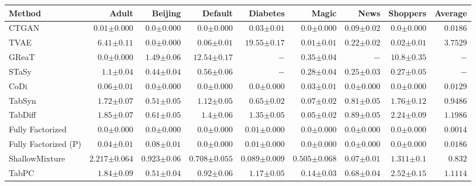 \begin{tabular}{lrrrrrrr|r}
    \toprule[0.8pt]
     \textbf{Method} & \textbf{Adult} & \textbf{Beijing} & \textbf{Default} & \textbf{Diabetes} & \textbf{Magic} & \textbf{News} & \textbf{Shoppers} & \textbf{Average} \\
    \midrule 
    CTGAN & $0.01${\tiny${\pm 0.000}$} & $0.0${\tiny${\pm 0.000}$} & $0.0${\tiny${\pm 0.000}$} & $0.03${\tiny${\pm 0.01}$} & $0.0${\tiny${\pm 0.000}$} & $0.09${\tiny${\pm 0.02}$} & $0.0${\tiny${\pm 0.000}$} & $0.0186$ \\
    TVAE & $6.41${\tiny${\pm 0.11}$} & $0.0${\tiny${\pm 0.000}$} & $0.06${\tiny${\pm 0.01}$} & $19.55${\tiny${\pm 0.17}$} & $0.01${\tiny${\pm 0.01}$} & $0.22${\tiny${\pm 0.02}$} & $0.02${\tiny${\pm 0.01}$} & $3.7529$ \\
    GReaT & $0.0${\tiny${\pm 0.000}$} & $1.49${\tiny${\pm 0.06}$} & $12.54${\tiny${\pm 0.17}$} & $-$ & $0.35${\tiny${\pm 0.04}$} & $-$ & $10.8${\tiny${\pm 0.35}$} & $-$ \\
    STaSy & $1.1${\tiny${\pm 0.04}$} & $0.44${\tiny${\pm 0.04}$} & $0.56${\tiny${\pm 0.06}$} & $-$ & $0.28${\tiny${\pm 0.04}$} & $0.25${\tiny${\pm 0.03}$} & $0.27${\tiny${\pm 0.05}$} & $-$ \\
    CoDi & $0.06${\tiny${\pm 0.01}$} & $0.0${\tiny${\pm 0.000}$} & $0.0${\tiny${\pm 0.000}$} & $0.0${\tiny${\pm 0.000}$} & $0.03${\tiny${\pm 0.01}$} & $0.0${\tiny${\pm 0.000}$} & $0.0${\tiny${\pm 0.000}$} & $0.0129$ \\
    TabSyn & $1.72${\tiny${\pm 0.07}$} & $0.51${\tiny${\pm 0.05}$} & $1.12${\tiny${\pm 0.05}$} & $0.65${\tiny${\pm 0.02}$} & $0.07${\tiny${\pm 0.02}$} & $0.81${\tiny${\pm 0.05}$} & $1.76${\tiny${\pm 0.12}$} & $0.9486$ \\
    TabDiff & $1.85${\tiny${\pm 0.07}$} & $0.61${\tiny${\pm 0.05}$} & $1.4${\tiny${\pm 0.06}$} & $1.35${\tiny${\pm 0.05}$} & $0.05${\tiny${\pm 0.02}$} & $0.89${\tiny${\pm 0.05}$} & $2.24${\tiny${\pm 0.09}$} & $1.1986$ \\
    \midrule
    Fully Factorized & $0.0${\tiny${\pm 0.000}$} & $0.0${\tiny${\pm 0.000}$} & $0.0${\tiny${\pm 0.000}$} & $0.01${\tiny${\pm 0.000}$} & $0.0${\tiny${\pm 0.000}$} & $0.0${\tiny${\pm 0.000}$} & $0.0${\tiny${\pm 0.000}$} & $0.0014$ \\
    Fully Factorized (P) & $0.04${\tiny${\pm 0.01}$} & $0.08${\tiny${\pm 0.01}$} & $0.0${\tiny${\pm 0.000}$} & $0.01${\tiny${\pm 0.000}$} & $0.0${\tiny${\pm 0.000}$} & $0.0${\tiny${\pm 0.000}$} & $0.0${\tiny${\pm 0.000}$} & $0.0186$ \\
    ShallowMixture & $2.217${\tiny${\pm 0.064}$} & $0.923${\tiny${\pm 0.06}$} & $0.708${\tiny${\pm 0.055}$} & $0.089${\tiny${\pm 0.009}$} & $0.505${\tiny${\pm 0.068}$} & $0.07${\tiny${\pm 0.01}$} & $1.311${\tiny${\pm 0.1}$} & $0.832$ \\
    TabPC & $1.84${\tiny${\pm 0.09}$} & $0.51${\tiny${\pm 0.04}$} & $0.92${\tiny${\pm 0.06}$} & $1.17${\tiny${\pm 0.05}$} & $0.14${\tiny${\pm 0.03}$} & $0.68${\tiny${\pm 0.04}$} & $2.52${\tiny${\pm 0.15}$} & $1.1114$ \\
    \bottomrule[1.0pt]
\end{tabular}